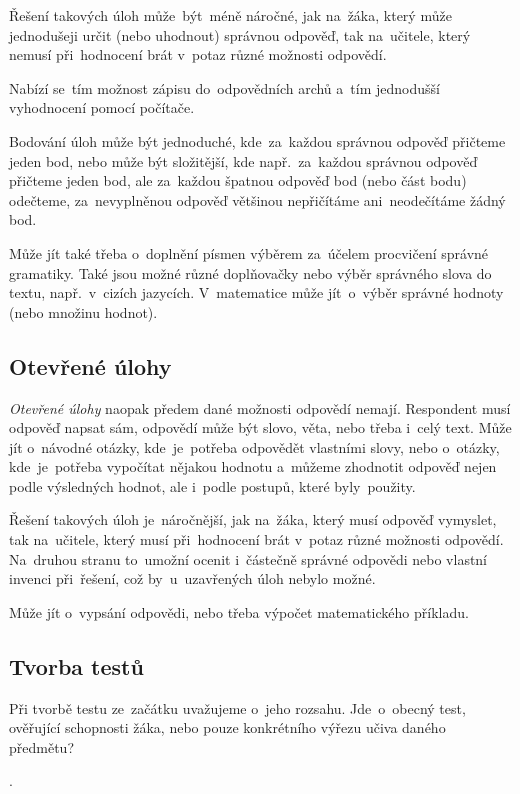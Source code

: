 \documentclass[14pt,a4paper]{article}
\begin{document}
        Řešení takových úloh může~být~méně náročné, jak na~žáka, který může jednodušeji určit (nebo uhodnout) správnou odpověď, tak na~učitele, který nemusí při~hodnocení brát v~potaz různé možnosti odpovědí.

        Nabízí se~tím možnost zápisu do~odpovědních archů a~tím jednodušší vyhodnocení pomocí počítače.

        Bodování úloh může být jednoduché, kde~za~každou správnou odpověď přičteme jeden bod, nebo může být složitější, kde např.~za~každou správnou odpověď přičteme jeden bod, ale za~každou špatnou odpověď bod (nebo část bodu) odečteme, za~nevyplněnou odpověď většinou nepřičítáme ani~neodečítáme žádný bod.

        Může jít také třeba o~doplnění písmen výběrem za~účelem procvičení správné gramatiky. Také jsou možné různé doplňovačky nebo výběr správného slova do textu, např.~v~cizích jazycích. V~matematice může jít~o~výběr správné hodnoty (nebo množinu hodnot).

        \subsection{Otevřené úlohy}
        \emph{Otevřené úlohy} naopak předem dané možnosti odpovědí nemají. Respondent musí odpověď napsat sám, odpovědí může být slovo, věta, nebo třeba i~celý text. Může jít o~návodné otázky, kde~je~potřeba odpovědět vlastními slovy, nebo o~otázky, kde~je~potřeba vypočítat nějakou hodnotu a~můžeme zhodnotit odpověď nejen podle výsledných hodnot, ale i~podle postupů, které byly~použity.

        Řešení takových úloh je~náročnější, jak na~žáka, který musí odpověď vymyslet, tak na~učitele, který musí při~hodnocení brát v~potaz různé možnosti odpovědí. Na~druhou stranu to~umožní ocenit i~částečně správné odpovědi nebo vlastní invenci při~řešení, což by~u~uzavřených úloh nebylo možné.

        Může jít o~vypsání odpovědi, nebo třeba výpočet matematického příkladu. \cite{rozhlasOUtazky}

        \subsection{Tvorba testů}
        Při tvorbě testu ze~začátku uvažujeme o~jeho rozsahu. Jde~o~obecný test, ověřující schopnosti žáka, nebo pouze konkrétního výřezu učiva daného předmětu?

        . \cite{Suchoradsky:testy}
        
\end{document}
